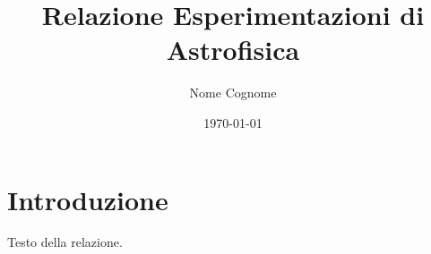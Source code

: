 \documentclass{article}
\begin{document}
\title{Relazione Esperimentazioni di Astrofisica}
\author{Nome Cognome}
\date{\today}
\maketitle
\section{Introduzione}
Testo della relazione.
\end{document}
